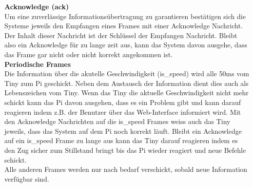 \documentclass[../../main.tex]{subfiles}
\begin{document}
        \pagebreak

        \textbf{Acknowledge (ack)}\\
        Um eine zuverlässige Informationsübertragung zu garantieren bestätigen sich die Systeme jeweils den Empfangen eines Frames mit einer Acknowledge Nachricht. Der Inhalt dieser Nachricht ist der Schlüssel der Empfangen Nachricht. Bleibt also ein Acknowledge für zu lange zeit aus, kann das System davon ausgehe, dass das Frame gar nicht oder nicht korrekt angekommen ist.\\

        \textbf{Periodische Frames}\\
        Die Information über die akutelle Geschwindigkeit (is\_speed) wird alle 50ms vom Tiny zum Pi geschickt. Neben dem Austausch der Information dient dies auch als Lebenszeichen vom Tiny. Wenn das Tiny die aktuelle Geschwindigkeit nicht mehr schickt kann das Pi davon ausgehen, dass es ein Problem gibt und kann darauf reagieren indem z.B. der Benutzer über das Web-Interface informiert wird. Mit den Acknowledge Nachrichten auf die is\_speed Frames weiss auch das Tiny jeweils, dass das System auf dem Pi noch korrekt läuft. Bleibt ein Acknowledge auf ein is\_speed Frame zu lange aus kann das Tiny darauf reagieren indem es den Zug sicher zum Stillstand bringt bis das Pi wieder reagiert und neue Befehle schickt.\\
        Alle anderen Frames werden nur nach bedarf verschickt, sobald neue Information verfügbar sind.

    
\end{document}
